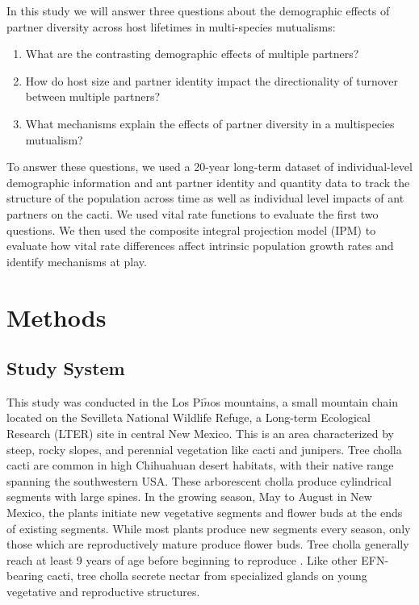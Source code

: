 \documentclass[12pt,a4paper]{article}
\begin{document}
In this study we will answer three questions about the demographic effects of partner diversity across host lifetimes in multi-species mutualisms:

\begin{enumerate}
	\item{What are the contrasting demographic effects of multiple partners?}
	\item{How do host size and partner identity impact the directionality of turnover between          multiple partners?}
	\item{What mechanisms explain the effects of partner diversity in a multispecies mutualism?}
\end{enumerate}


To answer these questions, we used a 20-year long-term dataset of individual-level demographic information and ant partner identity and quantity data to track the structure of the population across time as well as individual level impacts of ant partners on the cacti.
We used vital rate functions to evaluate the first two questions. 
We then used the composite integral projection model (IPM) to evaluate how vital rate differences affect intrinsic population growth rates and identify mechanisms at play. 



\section*{Methods}
\subsection*{Study System}
This study was conducted in the Los Pi$\tilde{n}$os mountains, a small mountain chain located on the Sevilleta National Wildlife Refuge, a Long-term Ecological Research (LTER) site in central New Mexico.
This is an area characterized by steep, rocky slopes, and perennial vegetation like cacti and junipers. 
Tree cholla cacti are common in high Chihuahuan desert habitats, with their native range spanning the southwestern USA\cite{Benson1982}. 
These arborescent cholla produce cylindrical segments with large spines. 
In the growing season, May to August in New Mexico, the plants initiate new vegetative segments and flower buds at the ends of existing segments. 
While most plants produce new segments every season, only those which are reproductively mature produce flower buds. 
Tree cholla generally reach at least 9 years of age before beginning to reproduce \cite{Ohm2014}.
Like other EFN-bearing cacti, tree cholla secrete nectar from specialized glands on young vegetative and reproductive structures\cite{Ness2006,Oliveira1999}.
\end{document}
